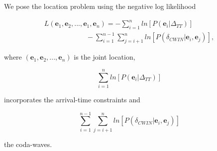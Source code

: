 \documentclass[12pt,double]{article}
\begin{document}
We pose the location problem using the negative log likelihood
\begin{linenomath*} \begin{equation}
\label{eq-Lstar-tt-cwi}
\begin{array}{l}
 L(\mathbf{e}_1, \mathbf{e}_2, ...,
\mathbf{e}_1, \mathbf{e}_n) = - \sum_{i=1}^n
ln\left[P(\mathbf{e}_i|\Delta_{TT})\right] \\
\hspace{6em}  - \sum_{i=1}^{n-1}
\sum_{j=i+1}^n
ln\left[P(\delta_{CWIN}|\mathbf{e}_i,\mathbf{e}_j)\right],
\end{array}
\end{equation} \end{linenomath*}
where $(\mathbf{e}_1, \mathbf{e}_2, ..., \mathbf{e}_n)$ is the joint
location,
\begin{linenomath*} \begin{equation}
\label{eq-ttcomponent} \sum_{i=1}^n
ln\left[P(\mathbf{e}_i|\Delta_{TT})\right]
\end{equation} \end{linenomath*}
incorporates the arrival-time constraints and
\begin{linenomath*} \begin{equation}
\label{eq-codacomponent} \sum_{i=1}^{n-1} \sum_{j=i+1}^n
ln\left[P(\delta_{CWIN}|\mathbf{e}_i,\mathbf{e}_j)\right]
\end{equation} \end{linenomath*}
 the coda-waves.
\end{document}
